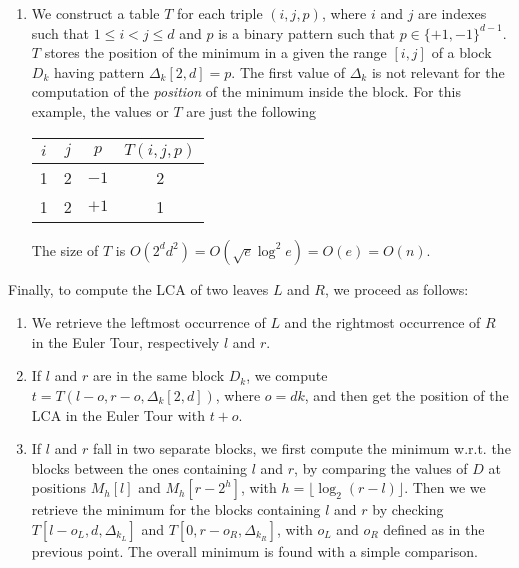 \begin{enumerate}
  \item We construct a table $T$ for each triple $(i, j, p)$, where $i$ and $j$
  are indexes such that $1 \le i < j \le d$ and $p$ is a binary pattern such
  that $p \in \{+1, -1 \}^{d - 1}$. $T$ stores the position of the minimum in a
  given the range $[i, j]$ of a block $D_k$ having pattern $\Delta_k[2, d] = p$.
  The first value of $\Delta_k$ is not relevant for the computation of the
  \emph{position} of the minimum inside the block.  For this example, the values
  or $T$ are just the following
  \begin{center}
    \begin{tabular}{c|c|c||c}
      $i$ & $j$ & $p$ & $T(i, j, p)$ \\\hline
      1 & 2 & $-1$ & 2 \\
      1 & 2 & $+1$ & 1 \\
    \end{tabular}
  \end{center}
  The size of $T$ is $O(2^dd^2) = O(\sqrt{e}\log^2 e) = O(e) = O(n)$.

\end{enumerate}

Finally, to compute the LCA of two leaves $L$ and $R$, we proceed as follows:
%
\begin{enumerate}

  \item We retrieve the leftmost occurrence of $L$ and the rightmost occurrence
  of $R$ in the Euler Tour, respectively $l$ and $r$.

  \item If $l$ and $r$ are in the same block $D_k$, we compute $t = T(l - o, r -
  o, \Delta_k[2, d])$, where $o = dk$, and then get the position of the LCA in
  the Euler Tour with $t + o$.

  \item If $l$ and $r$ fall in two separate blocks, we first compute the minimum
  w.r.t. the blocks between the ones containing $l$ and $r$, by comparing the
  values of $D$ at positions $M_h[l]$ and $M_h[r - 2^h]$, with $h = \lfloor
  \log_2 (r - l)\rfloor$. Then we we retrieve the minimum for the blocks
  containing $l$ and $r$ by checking $T[l - o_L, d, \Delta_{k_L}]$ and $T[0, r -
  o_R, \Delta_{k_R}]$, with $o_L$ and $o_R$ defined as in the previous point.
  The overall minimum is found with a simple comparison.

\end{enumerate}
